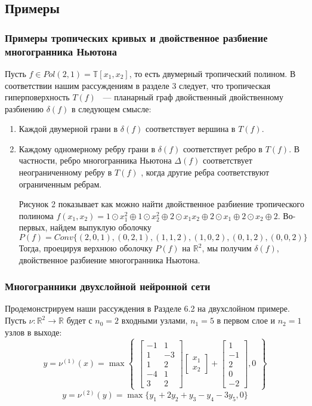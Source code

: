 \documentclass[russian]{lecture-notes}
\begin{document}
	\subsection{Примеры}
	\subsubsection{Примеры тропических кривых и двойственное разбиение многогранника Ньютона}
	
	Пусть $f \in Pol(2,1) = \mathbb{T}[x_1,x_2]$, то есть двумерный тропический полином. В соответствии нашим рассуждениям в разделе 3 следует, что тропическая гиперповерхность $T(f)$ ~--- планарный граф двойственный двойственному разбиению $\delta (f)$ в следующем смысле:
	\begin{enumerate}
		\item  Каждой двумерной грани в $\delta (f)$ соответствует вершина в $T(f)$.
		\item Каждому одномерному ребру грани в $\delta (f)$  соответствует ребро в $T(f)$. В частности, ребро многогранника Ньютона $\Delta (f)$ соответствует неограниченному ребру в $T(f)$ , когда другие ребра соответствуют ограниченным ребрам.
		
	Рисунок 2 показывает как можно найти двойственное разбиение тропического полинома $f(x_1,x_2) = 1 \odot x_1^2\oplus 1 \odot x^2_2\oplus 2 \odot x_1x_2 \oplus 2 \odot x_1 \oplus 2 \odot x_2 \oplus 2$. Во-первых, найдем выпуклую оболочку 
	\[
		P(f) = Conv\{(2,0,1),(0,2,1),(1,1,2),(1,0,2),(0,1,2),(0,0,2)\}
	\]
	Тогда, проецируя верхнюю оболочку $P(f)$ на $\mathbb{R}^2$, мы получим $\delta(f)$, двойственное разбиение многогранника Ньютона.
	\end{enumerate}
	\subsubsection{Многогранники двухслойной нейронной сети }
	Продемонстрируем наши рассуждения в Разделе 6.2 на двухслойном примере. Пусть $\nu :\mathbb{R}^2 \rightarrow \mathbb{R}$ будет с $n_0=2$ входными узлами, $n_1 = 5$ в первом слое и $n_2 = 1$ узлов в выходе:
	\[
		y = \nu^{(1)}(x) = \max 
		\begin{Bmatrix}
			\begin{bmatrix}
			-1 &1 \\
			1 &-3 \\
			1 &2 \\
			-4 &1\\
			3 &2 
			\end{bmatrix}
		\begin{bmatrix}
		x_1\\
		x_2
		\end{bmatrix} 
		+ \begin{bmatrix}
		1\\
		-1\\
		2\\
		0\\
		-2
		\end{bmatrix}, 0
		\end{Bmatrix}
	\]
	\[
		y = \nu^{(2)}(y) = \max\{y_1 + 2y_2 + y_3 - y_4 - 3y_5, 0\}
	\]
	
\end{document}
